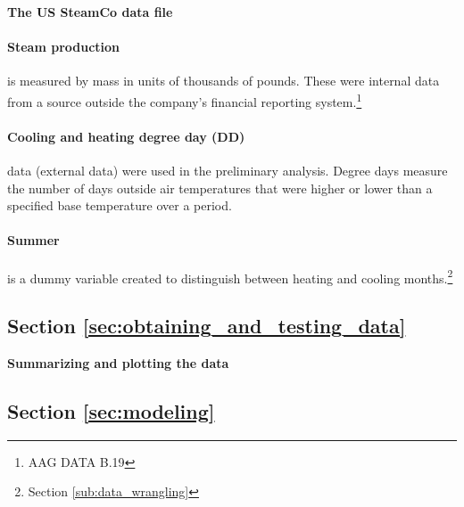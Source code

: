 \begin{exercise}
  \label{ex:the_us_steamco_data_file}

\textbf{The US SteamCo data file}



\paragraph{Steam production} is measured by mass in units of thousands of pounds. These were internal data from a source outside the company's financial reporting system.\footnote{AAG DATA B.19} 
\paragraph{Cooling and heating degree day (DD)} data (external data) were used in the preliminary analysis. Degree days measure the number of days outside air temperatures that were higher or lower than a specified base temperature over a period. 
\paragraph{Summer} is a dummy variable created to distinguish between heating and cooling months.\footnote{Section \ref{sub:data_wrangling}}

\end{exercise}

\subsection{Section \ref{sec:obtaining_and_testing_data}}

\begin{exercise}
\label{ex:summarizing_and_plotting}

\textbf{Summarizing and plotting the data}










\end{exercise}

\subsection{Section \ref{sec:modeling}}

